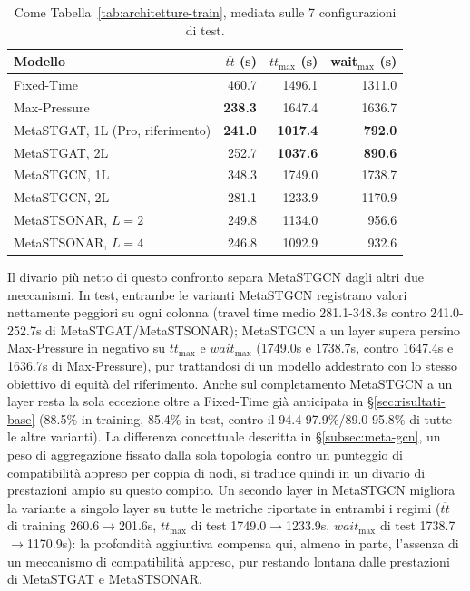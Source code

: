 \begin{table}[htbp]
  \centering
  \begin{tabular}{@{}lrrr@{}}
    \toprule
    Modello                          & $\overline{tt}$ (s) & $tt_{\max}$ (s) & wait$_{\max}$ (s) \\
    \midrule
    Fixed-Time                       & 460.7               & 1496.1          & 1311.0            \\
    Max-Pressure                     & \textbf{238.3}      & 1647.4          & 1636.7            \\
    MetaSTGAT, 1L (Pro, riferimento) & \textbf{241.0}      & \textbf{1017.4} & \textbf{792.0}    \\
    MetaSTGAT, 2L                    & 252.7               & \textbf{1037.6} & \textbf{890.6}    \\
    MetaSTGCN, 1L                    & 348.3               & 1749.0          & 1738.7            \\
    MetaSTGCN, 2L                    & 281.1               & 1233.9          & 1170.9            \\
    MetaSTSONAR, $L{=}2$             & 249.8               & 1134.0          & 956.6             \\
    MetaSTSONAR, $L{=}4$             & 246.8               & 1092.9          & 932.6             \\
    \bottomrule
  \end{tabular}
  \caption{Come Tabella~\ref{tab:architetture-train}, mediata sulle 7
    configurazioni di test.}
  \label{tab:architetture-test}
\end{table}

Il divario più netto di questo confronto separa MetaSTGCN dagli altri due
meccanismi. In test, entrambe le varianti
MetaSTGCN registrano valori nettamente peggiori su ogni colonna (travel time medio
281.1-348.3s contro 241.0-252.7s di MetaSTGAT/MetaSTSONAR); MetaSTGCN a un
layer supera persino Max-Pressure in negativo su $tt_{\max}$ e $wait_{\max}$
(1749.0s e 1738.7s, contro 1647.4s e 1636.7s di Max-Pressure), pur
trattandosi di un modello addestrato con lo stesso obiettivo di equità del
riferimento. Anche sul completamento MetaSTGCN a un layer resta la sola
eccezione oltre a Fixed-Time già anticipata in
§\ref{sec:risultati-base} (88.5\% in training, 85.4\% in test, contro il
94.4-97.9\%/89.0-95.8\% di tutte le altre varianti). La differenza
concettuale descritta in §\ref{subsec:meta-gcn},
un peso di aggregazione fissato dalla sola topologia contro un punteggio di
compatibilità appreso per coppia di nodi, si traduce quindi in un divario di
prestazioni ampio su questo compito.
Un secondo layer in MetaSTGCN
migliora la variante a singolo layer su tutte le metriche riportate in
entrambi i regimi ($\overline{tt}$ di training 260.6$\to$201.6s,
$tt_{\max}$ di test 1749.0$\to$1233.9s, $wait_{\max}$ di test
1738.7$\to$1170.9s): la profondità aggiuntiva compensa qui, almeno in
parte, l'assenza di un meccanismo di compatibilità appreso, pur restando
lontana dalle prestazioni di MetaSTGAT e MetaSTSONAR.

